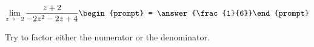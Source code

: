 \documentclass{ximera}
\author{Bart Snapp}
\begin{document}
\begin{exercise}

\[
\lim_{z\to -2 } \frac{z+2}{-2 z^2-2 z+4}\begin{prompt} = \answer{\frac{1}{6}}\end{prompt}
\]
\begin{hint}
Try to factor either the numerator or the denominator.
\end{hint}
\end{exercise}
\end{document}
